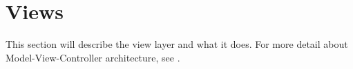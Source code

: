 \section{Views}
This section will describe the view layer and what it does. For more detail about Model-View-Controller architecture, see .



